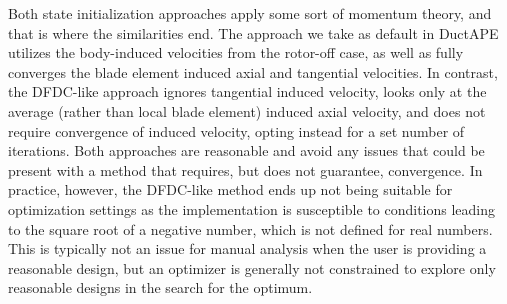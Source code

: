 %         







Both state initialization approaches apply some sort of momentum theory, and that is where the similarities end.
%
The approach we take as default in DuctAPE utilizes the body-induced velocities from the rotor-off case, as well as fully converges the blade element induced axial and tangential velocities.
%
In contrast, the DFDC-like approach ignores tangential induced velocity, looks only at the average (rather than local blade element) induced axial velocity, and does not require convergence of induced velocity, opting instead for a set number of iterations.
%
Both approaches are reasonable and avoid any issues that could be present with a method that requires, but does not guarantee, convergence.
%
In practice, however, the DFDC-like method ends up not being suitable for optimization settings as the implementation is susceptible to conditions leading to the square root of a negative number, which is not defined for real numbers.
%
This is typically not an issue for manual analysis when the user is providing a reasonable design, but an optimizer is generally not constrained to explore only reasonable designs in the search for the optimum.



